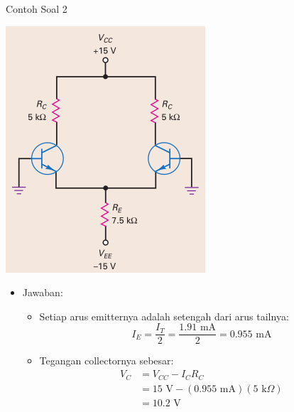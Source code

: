 \documentclass[aspectratio=169]{beamer}
\begin{document}
\begin{frame}{Contoh Soal 2}
	\begin{multicols}{2}
		\begin{center}
			\includegraphics[width=0.6\textheight]{gambar/01.latihan_soal_1a}
		\end{center}
		\columnbreak
		\begin{itemize}
			\item Jawaban:
			\begin{itemize}
				\item Setiap arus emitternya adalah setengah dari arus tailnya:
				\[ I_E = \frac{I_T}{2} = \frac{1.91 \text{ mA}}{2} = 0.955 \text{ mA} \]
				\item Tegangan collectornya sebesar:
				\begin{align*}
					V_C &= V_{CC} - I_C R_C \\
					&= 15 \text{ V} - (0.955 \text{ mA})(5 \text{ k}\Omega) \\
					&= 10.2 \text{ V}
				\end{align*}
			\end{itemize}
		\end{itemize}
		\vfill\null
	\end{multicols}
\end{frame}
\end{document}
